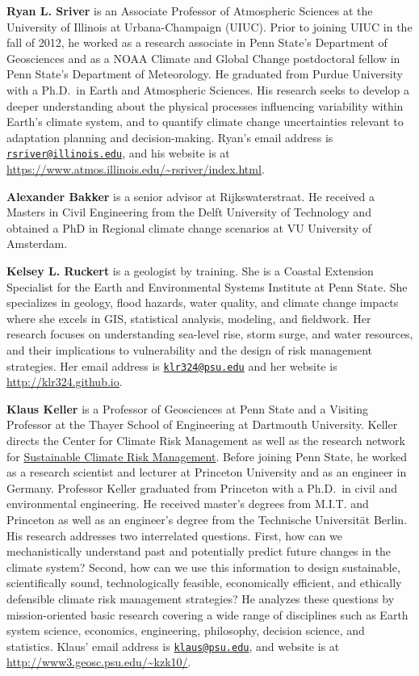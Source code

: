 \documentclass[
  11pt,
]{book}
\begin{document}
\textbf{Ryan L. Sriver} is an Associate Professor of Atmospheric Sciences at the University of Illinois at Urbana-Champaign (UIUC). Prior to joining UIUC in the fall of 2012, he worked as a research associate in Penn State's Department of Geosciences and as a NOAA Climate and Global Change postdoctoral fellow in Penn State's Department of Meteorology. He graduated from Purdue University with a Ph.D.~in Earth and Atmospheric Sciences. His research seeks to develop a deeper understanding about the physical processes influencing variability within Earth's climate system, and to quantify climate change uncertainties relevant to adaptation planning and decision-making. Ryan's email address is \href{mailto:rsriver@illinois.edu}{\nolinkurl{rsriver@illinois.edu}}, and his website is at \url{https://www.atmos.illinois.edu/~rsriver/index.html}.

\textbf{Alexander Bakker} is a senior advisor at Rijkswaterstraat. He received a Masters in Civil Engineering from the Delft University of Technology and obtained a PhD in Regional climate change scenarios at VU University of Amsterdam.

\textbf{Kelsey L. Ruckert} is a geologist by training. She is a Coastal Extension Specialist for the Earth and Environmental Systems Institute at Penn State. She specializes in geology, flood hazards, water quality, and climate change impacts where she excels in GIS, statistical analysis, modeling, and fieldwork. Her research focuses on understanding sea-level rise, storm surge, and water resources, and their implications to vulnerability and the design of risk management strategies. Her email address is \href{mailto:klr324@psu.edu}{\nolinkurl{klr324@psu.edu}} and her website is \url{http://klr324.github.io}.

\textbf{Klaus Keller} is a Professor of Geosciences at Penn State and a Visiting Professor at the Thayer School of Engineering at Dartmouth University. Keller directs the Center for Climate Risk Management as well as the research network for \href{https://scrimhub.org}{Sustainable Climate Risk Management}. Before joining Penn State, he worked as a research scientist and lecturer at Princeton University and as an engineer in Germany. Professor Keller graduated from Princeton with a Ph.D.~in civil and environmental engineering. He received master's degrees from M.I.T. and Princeton as well as an engineer's degree from the Technische Universität Berlin. His research addresses two interrelated questions. First, how can we mechanistically understand past and potentially predict future changes in the climate system? Second, how can we use this information to design sustainable, scientifically sound, technologically feasible, economically efficient, and ethically defensible climate risk management strategies? He analyzes these questions by mission-oriented basic research covering a wide range of disciplines such as Earth system science, economics, engineering, philosophy, decision science, and statistics. Klaus' email address is \href{mailto:klaus@psu.edu}{\nolinkurl{klaus@psu.edu}}, and website is at \url{http://www3.geosc.psu.edu/~kzk10/}.
\end{document}
